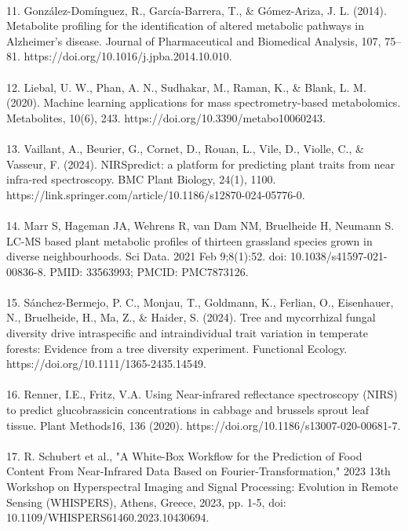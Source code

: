 \documentclass[12pt,a4paper]{report}
\begin{document}
\\
11. González-Domínguez, R., García-Barrera, T., \& Gómez-Ariza, J. L. (2014). Metabolite profiling for the identification of altered metabolic pathways in Alzheimer's disease. Journal of Pharmaceutical and Biomedical Analysis, 107, 75–81. https://doi.org/10.1016/j.jpba.2014.10.010. \\
\\
12. Liebal, U. W., Phan, A. N., Sudhakar, M., Raman, K., \& Blank, L. M. (2020). Machine learning applications for mass spectrometry-based metabolomics. Metabolites, 10(6), 243. https://doi.org/10.3390/metabo10060243. \\
\\
13. Vaillant, A., Beurier, G., Cornet, D., Rouan, L., Vile, D., Violle, C., \& Vasseur, F. (2024). NIRSpredict: a platform for predicting plant traits from near infra-red spectroscopy. BMC Plant Biology, 24(1), 1100. https://link.springer.com/article/10.1186/s12870-024-05776-0. \\
\\
14. Marr S, Hageman JA, Wehrens R, van Dam NM, Bruelheide H, Neumann S. LC-MS based plant metabolic profiles of thirteen grassland species grown in diverse neighbourhoods. Sci Data. 2021 Feb 9;8(1):52. doi: 10.1038/s41597-021-00836-8. PMID: 33563993; PMCID: PMC7873126. \\
\\
15. Sánchez-Bermejo, P. C., Monjau, T., Goldmann, K., Ferlian, O., Eisenhauer, N., Bruelheide, H., Ma, Z., \& Haider, S. (2024). Tree and mycorrhizal fungal diversity drive intraspecific and intraindividual trait variation in temperate forests: Evidence from a tree diversity experiment. Functional Ecology. https://doi.org/10.1111/1365-2435.14549. \\
\\
16. Renner, I.E., Fritz, V.A. Using Near-infrared reflectance spectroscopy (NIRS) to predict glucobrassicin concentrations in cabbage and brussels sprout leaf tissue. Plant Methods16, 136 (2020). https://doi.org/10.1186/s13007-020-00681-7. \\
\\
17. R. Schubert et al., "A White-Box Workflow for the Prediction of Food Content From Near-Infrared Data Based on Fourier-Transformation," 2023 13th Workshop on Hyperspectral Imaging and Signal Processing: Evolution in Remote Sensing (WHISPERS), Athens, Greece, 2023, pp. 1-5, doi: 10.1109/WHISPERS61460.2023.10430694. \\
\\
\end{document}
